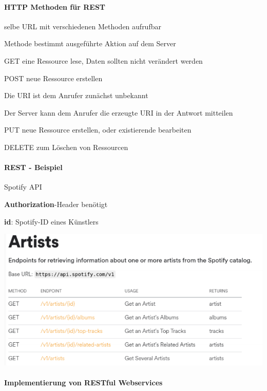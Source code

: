 \documentclass[10pt]{article}
\begin{document}
  \paragraph{HTTP Methoden für REST}
  
  \begin{itemize*}
    \item selbe URL mit verschiedenen Methoden aufrufbar
    \item Methode bestimmt ausgeführte Aktion auf dem Server
  \end{itemize*}
  \begin{description*}
    \item[GET] eine Ressource lese, Daten sollten nicht verändert werden
    \item[POST] neue Ressource erstellen
    \begin{itemize*}
      \item Die URI ist dem Anrufer zunächst unbekannt
      \item Der Server kann dem Anrufer die erzeugte URI in der Antwort mitteilen
    \end{itemize*}
    \item[PUT] neue Ressource erstellen, oder existierende bearbeiten
    \item[DELETE] zum Löschen von Ressourcen
  \end{description*}
  
  \paragraph{REST - Beispiel}
  
  Spotify API
  \begin{itemize*}
    \item \textbf{Authorization}-Header benötigt
    \item \textbf{id}: Spotify-ID eines Künstlers
  \end{itemize*}
  \begin{center}
    \includegraphics[width=0.4\linewidth]{Assets/Programmierparadigmen-spotify-api}
  \end{center}
  
  \paragraph{Implementierung von RESTful Webservices}
  
\end{document}
